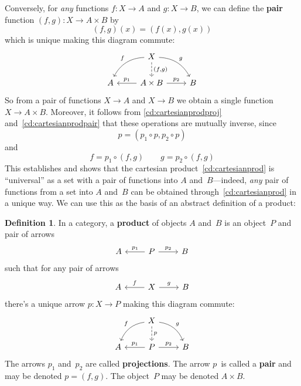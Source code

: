 \documentclass[letterpaper,12pt]{article}
\newcommand{\after}{\circ}
\newcommand{\pair}[2]{({#1},{#2})}
\newcommand{\textdefn}{\textbf}
\theoremstyle{definition}
\newtheorem{defn}[equation]{Definition}
\theoremstyle{plain}
\numberwithin{equation}{section}
\begin{document}
Conversely, for \emph{any} functions \(f:X\to A\) and \(g:X\to B\), we can define the \textdefn{pair} function \((f,g):X\to A\times B\) by
\[(f,g)(x)=(f(x),g(x))\]
which is unique making this diagram commute:
\begin{equation}
\begin{tikzcd}
 & X \ar[ld,bend right,"f"'] \ar[d,dashed,"{(f,g)}"] \ar[rd,bend left,"g"] & \\
A & \ar[l,"p_1"'] A\times B \ar[r,"p_2"] & B
\end{tikzcd}
\label{cd:cartesianprodpair}
\end{equation}
So from a pair of functions \(X\to A\) and \(X\to B\) we obtain a single function \(X\to A\times B\). Moreover, it follows from \eqref{cd:cartesianprodproj} and~\eqref{cd:cartesianprodpair} that these operations are mutually inverse, since
\[p=(p_1\after p,p_2\after p)\]
and
\[f=p_1\after(f,g)\qquad g=p_2\after(f,g)\]
This establishes  and shows that the cartesian product~\eqref{cd:cartesianprod} is ``universal'' as a set with a pair of functions into \(A\) and~\(B\)---indeed, \emph{any} pair of functions from a set into \(A\) and~\(B\) can be obtained through~\eqref{cd:cartesianprod} in a unique way. We can use this as the basis of an abstract definition of a product:
\begin{defn}
In a category, a \textdefn{product} of objects \(A\) and~\(B\) is an object~\(P\) and pair of arrows
\begin{equation}
\begin{tikzcd}
A & \ar[l,"p_1"'] P \ar[r,"p_2"] & B
\end{tikzcd}
\label{cd:product}
\end{equation}
such that for any pair of arrows
\begin{equation*}
\begin{tikzcd}
A & \ar[l,"f"'] X \ar[r,"g"] & B
\end{tikzcd}
\end{equation*}
there's a unique arrow \(p:X\to P\) making this diagram commute:
\begin{equation}
\begin{tikzcd}
 & X \ar[ld,bend right,"f"'] \ar[d,dashed,"p"] \ar[rd,bend left,"g"] & \\
A & \ar[l,"p_1"'] P \ar[r,"p_2"] & B
\end{tikzcd}
\label{cd:productump}
\end{equation}
The arrows \(p_1\) and~\(p_2\) are called \textdefn{projections}. The arrow \(p\)~is called a \textdefn{pair} and may be denoted \(p=\pair{f}{g}\). The object~\(P\) may be denoted \(A\times B\).
\end{defn}
\end{document}

